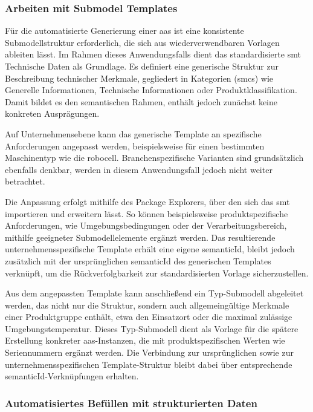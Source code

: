 \subsubsection{Arbeiten mit Submodel Templates}
\label{chap:ErstellenvonSubmodelTemplates}
Für die automatisierte Generierung einer \acs{aas} ist eine konsistente Submodellstruktur erforderlich, die sich aus wiederverwendbaren Vorlagen ableiten lässt.
Im Rahmen dieses Anwendungsfalls dient das standardisierte \acs{smt} Technische Daten \cite{SpezifikaitonTechnischeDaten} als Grundlage. 
Es definiert eine generische Struktur zur Beschreibung technischer Merkmale, gegliedert in Kategorien (\acsp{smc}) wie Generelle Informationen, Technische Informationen oder Produktklassifikation. 
Damit bildet es den semantischen Rahmen, enthält jedoch zunächst keine konkreten Ausprägungen.

Auf Unternehmensebene kann das generische Template an spezifische Anforderungen angepasst werden, beispielsweise für einen bestimmten Maschinentyp wie die robocell.
Branchenspezifische Varianten sind grundsätzlich ebenfalls denkbar, werden in diesem Anwendungsfall jedoch nicht weiter betrachtet.

Die Anpassung erfolgt mithilfe des Package Explorers, über den sich das \acs{smt} importieren und erweitern lässt.
So können beispielsweise produktspezifische Anforderungen, wie Umgebungsbedingungen oder der Verarbeitungsbereich, mithilfe geeigneter Submodellelemente ergänzt werden.
Das resultierende unternehmensspezifische Template erhält eine eigene semanticId, bleibt jedoch zusätzlich mit der ursprünglichen semanticId des generischen Templates verknüpft, um die Rückverfolgbarkeit zur standardisierten Vorlage sicherzustellen.

Aus dem angepassten Template kann anschließend ein Typ-Submodell abgeleitet werden, das nicht nur die Struktur, sondern auch allgemeingültige Merkmale einer Produktgruppe enthält, etwa den Einsatzort oder die maximal zulässige Umgebungstemperatur.
Dieses Typ-Submodell dient als Vorlage für die spätere Erstellung konkreter \acs{aas}-Instanzen, die mit produktspezifischen Werten wie Seriennummern ergänzt werden.
Die Verbindung zur ursprünglichen sowie zur unternehmensspezifischen Template-Struktur bleibt dabei über entsprechende semanticId-Verknüpfungen erhalten.

\subsubsection{Automatisiertes Befüllen mit strukturierten Daten}


